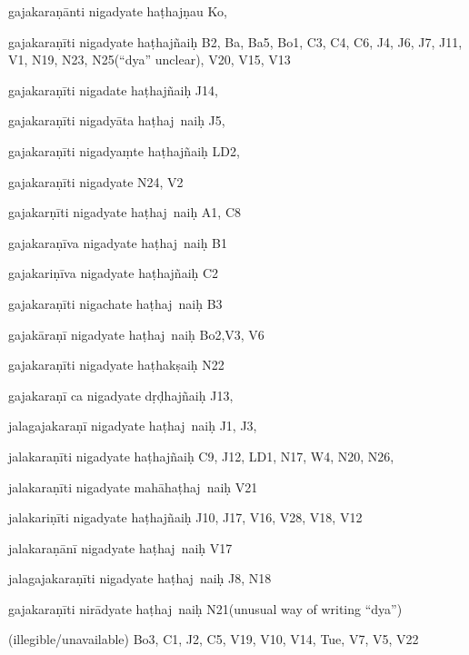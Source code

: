 \begin{ekdosis}
\begin{marma}[hp01_055]
\begin{marma}[hp02_009]
\begin{marma}[hp02_011]
      \begin{marma}[hp02_26d]
      \item[gajakaraṇānti nigadyate haṭhajṇau] Ko,
      \item[gajakaraṇīti nigadyate haṭhajñaiḥ] B2, Ba, Ba5, Bo1, C3, C4, C6, J4, J6, J7, J11, V1, N19, N23, N25(“dya” unclear), V20, V15, V13
      \item[gajakaraṇīti nigadate haṭhajñaiḥ] J14,
      \item[gajakaraṇīti nigadyāta haṭhaj~naiḥ] J5,
      \item[gajakaraṇīti nigadyaṃte haṭhajñaiḥ] LD2,
      \item[gajakaraṇīti nigadyate] N24, V2
      \item[gajakarṇīti nigadyate haṭhaj~naiḥ] A1, C8
      \item[gajakaraṇīva nigadyate haṭhaj~naiḥ] B1
      \item[gajakariṇīva nigadyate haṭhajñaiḥ] C2
      \item[gajakaraṇīti nigachate haṭhaj~naiḥ] B3
      \item[gajakāraṇī nigadyate haṭhaj~naiḥ] Bo2,V3, V6
      \item[gajakaraṇīti nigadyate haṭhakṣaiḥ] N22
      \item[gajakaraṇī ca nigadyate dṛḍhajñaiḥ] J13,
      \item[jalagajakaraṇī nigadyate haṭhaj~naiḥ] J1, J3, 
      \item[jalakaraṇīti nigadyate haṭhajñaiḥ] C9, J12, LD1, N17, W4, N20, N26, 
      \item[jalakaraṇīti nigadyate mahāhaṭhaj~naiḥ] V21
      \item[jalakariṇīti nigadyate haṭhajñaiḥ] J10, J17, V16, V28, V18, V12
      \item[jalakaraṇānī nigadyate haṭhaj~naiḥ] V17
      \item[jalagajakaraṇīti nigadyate haṭhaj~naiḥ] J8, N18
      \item[gajakaraṇīti nirādyate haṭhaj~naiḥ] N21(unusual way of writing “dya”)
      \item[(illegible/unavailable)] Bo3, C1, J2, C5, V19, V10, V14, Tue, V7, V5, V22
        \begin{description}
        \end{description}
      \end{marma}


\end{marma}
\end{marma}
\end{marma}
\end{ekdosis}
